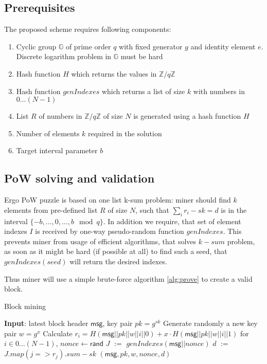 \documentclass[]{article}
\def\Let#1#2{\State #1 $:=$ #2}
\newcommand{\msg}{\mathsf{msg}}
\begin{document}
    \subsection{Prerequisites}
    The proposed scheme requires following components:
    \begin{enumerate}
        \item Cyclic group $\mathbb{G}$ of prime order $q$ with fixed generator $g$
        and identity element $e$. Discrete logarithm problem in $\mathbb{G}$ must be hard
        \item Hash function $H$ which returns the values in $\mathbb{Z}/q\mathbb{Z}$
        \item Hash function $genIndexes$ which returns a list of size $k$
        with numbers in $0\dots (N-1)$
        \item List $R$ of numbers in $\mathbb{Z}/q\mathbb{Z}$ of size $N$ is generated
        using a hash function $H$
        \item Number of elements $k$ required in the solution
        \item Target interval parameter $b$
    \end{enumerate}

    \subsection{PoW solving and validation}

    Ergo PoW puzzle is based on one list k-sum problem: miner should find
    $k$ elements from pre-defined list $R$ of size $N$, such that
    $\sum_{i} r_{i} - sk = d$ is in the interval $\{-b,\dots,0,\dots,b\mod q\}$.
    In addition we require, that set of element indexes $I$ is received
    by one-way pseudo-random function $genIndexes$. This prevents miner
    from usage of efficient algorithms, that solves $k-sum$ problem, as
    soon as it might be hard (if possible at all) to find such a seed,
    that $genIndexes(seed)$ will return the desired indexes.

    Thus miner will use a simple brute-force algorithm \ref{alg:prove} to
    create a valid block.

    \begin{algorithm}[H]
        \caption{Block mining}
        \label{alg:prove}
        \begin{algorithmic}[1]
            \State \textbf{Input}: latest block header $\msg$, key pair $pk=g^{sk}$
            \State Generate randomly a new key pair $w=g^x$
            \State Calculate $r_i=H(\msg||pk||w||i||0)+x\cdot H(\msg||pk||w||i||1)$ for $i\in 0\dots (N-1)$,
                \State $nonce\leftarrow\mathsf{rand}$
                \Let{$J$}{$genIndexes(\msg||nonce)$}
                \Let{$d$}{$J.map(j => r_j).sum - sk$}
                \State \Return $(\msg,pk,w,nonce,d)$
                \EndIf
            \EndWhile
        \end{algorithmic}
    \end{algorithm}
\end{document}
